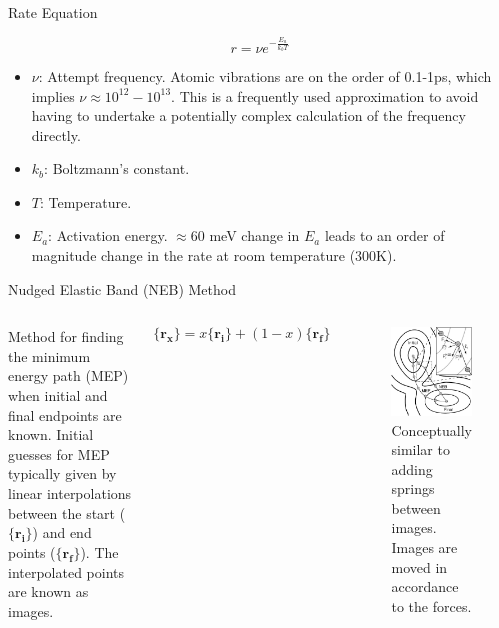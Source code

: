 \documentclass[aspectratio=169]{beamer}
\let \vec \mathbf
\begin{document}
\begin{frame}{Rate Equation}

\begin{equation*}
r = \nu e^{-\frac{E_a}{k_bT}}
\end{equation*} 

\begin{itemize}
    \item $\nu$: Attempt frequency. Atomic vibrations are on the order of 0.1-1ps, which implies $\nu \approx 10^{12}-10^{13}$. This is a frequently used approximation to avoid having to undertake a potentially complex calculation of the frequency directly.
    \item $k_b$: Boltzmann's constant.
    \item $T$: Temperature.
    \item $E_a$: Activation energy. $\approx 60$ meV change in $E_a$ leads to an order of magnitude change in the rate at room temperature (300K).
\end{itemize}

\end{frame} 
\begin{frame}{Nudged Elastic Band (NEB) Method}
\begin{columns}
Method for finding the minimum energy path (MEP) when initial and final endpoints are known.\newline
\newline 
Initial guesses for MEP typically given by linear interpolations between the start ($\{\vec{r_i}\}$) and end points ($\{\vec{r_f}\}$). The interpolated points are known as images.

\begin{equation*}
\{\vec{r_x}\} = x \{\vec{r_i}\} + (1-x)\{\vec{r_f}\}
\end{equation*} 
\begin{figure}
    \centering
    \includegraphics[width=0.55\linewidth]{lectures/figures/12_NEB.png}
    \caption{Conceptually similar to adding springs between images. Images are moved in accordance to the forces.\cite{henkelmanClimbingImageNudged2000}}
\end{figure} 
\end{columns} 
\end{frame} 
\end{document}
